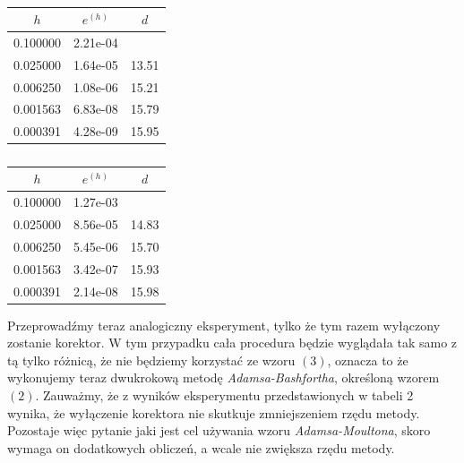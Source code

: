 \documentclass[a4paper,12pt]{article}
\begin{document}
\begin{table}
\centering
\caption{}
\vspace{1mm}
\begin{tabular}{|l|l|l|}
\hline
\multicolumn{1}{|c|}{$h$}      & \multicolumn{1}{c|}{$e^{(h)}$} & \multicolumn{1}{c|}{$d$}   \\ \hline
\multicolumn{1}{|c|}{0.100000} & \multicolumn{1}{c|}{2.21e-04}  & \multicolumn{1}{c|}{}  \\
\multicolumn{1}{|c|}{0.025000} & \multicolumn{1}{c|}{1.64e-05}  & \multicolumn{1}{c|}{13.51} \\
0.006250                       & 1.08e-06                       & 15.21                      \\
0.001563                       & 6.83e-08                       & 15.79                      \\
0.000391                       & 4.28e-09                       & 15.95                      \\ \hline
\end{tabular}

\caption{}
\vspace{1mm}
\begin{tabular}{|l|l|l|}
\hline
\multicolumn{1}{|c|}{$h$}      & \multicolumn{1}{c|}{$e^{(h)}$} & \multicolumn{1}{c|}{$d$}   \\ \hline
\multicolumn{1}{|c|}{0.100000} & \multicolumn{1}{c|}{1.27e-03}  & \multicolumn{1}{c|}{}  \\
\multicolumn{1}{|c|}{0.025000} & \multicolumn{1}{c|}{8.56e-05}  & \multicolumn{1}{c|}{14.83} \\
0.006250                       & 5.45e-06                       & 15.70                      \\
0.001563                       & 3.42e-07                       & 15.93                      \\
0.000391                       & 2.14e-08                       & 15.98                      \\ \hline
\end{tabular}

\end{table}
Przeprowadźmy teraz analogiczny eksperyment, tylko że tym razem wyłączony zostanie korektor. W tym przypadku cała procedura będzie wyglądała tak samo z tą tylko różnicą, że nie będziemy korzystać ze wzoru $(3)$, oznacza to że wykonujemy teraz dwukrokową metodę \textit{Adamsa-Bashfortha}, określoną wzorem $(2)$. Zauważmy, że z wyników eksperymentu przedstawionych w tabeli 2 wynika, że wyłączenie korektora nie skutkuje zmniejszeniem rzędu metody. Pozostaje więc pytanie jaki jest cel używania wzoru \textit{Adamsa-Moultona}, skoro wymaga on dodatkowych obliczeń, a wcale nie zwiększa rzędu metody.\\
\end{document}
